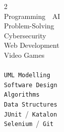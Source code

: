 \documentclass[lighthipster]{simplehipstercv}
\begin{document}
\begin{paracol}{2}
{\\[0.5em]
Programming~\textbullet~AI\\[0.3em]
Problem-Solving\\[0.3em]
Cybersecurity\\[0.3em]
Web Development\\[0.3em]
Video Games\\[0.8em]

\\[0.5em]
\texttt{UML Modelling}\\[0.3em]
\texttt{Software Design}\\[0.3em]
\texttt{Algorithms}\\[0.3em]
\texttt{Data Structures}\\[0.3em]
\texttt{JUnit}~/~\texttt{Katalon}\\[0.3em]
\texttt{Selenium}~/~\texttt{Git}\\[0.3em]
}

\switchcolumn
\small


\end{paracol}
\end{document}

